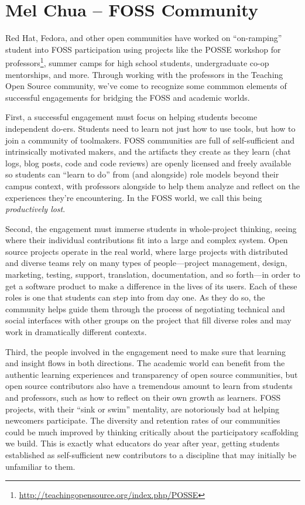 \documentclass{sig-alt-release2}
\begin{document}
\section{Mel Chua -- FOSS Community}

Red Hat, Fedora, and other open communities have worked on ``on-ramping'' student into FOSS participation using projects like the POSSE workshop for professors\footnote{\url{http://teachingopensource.org/index.php/POSSE}}, summer camps for high school students, undergraduate co-op mentorships, and more. Through working with the professors in the Teaching Open Source community, we've come to recognize some commmon elements of successful engagements for bridging the FOSS and academic worlds.

First, a successful engagement must focus on helping students become independent do-ers. Students need to learn not just how to use tools, but how to join a community of toolmakers. FOSS communities are full of self-sufficient and intrinsically motivated makers, and the artifacts they create as they learn (chat logs, blog posts, code and code reviews) are openly licensed and freely available so students can ``learn to do'' from (and alongside) role models beyond their campus context, with professors alongside to help them analyze and reflect on the experiences they're encountering. In the FOSS world, we call this being {\em productively lost}.

Second, the engagement must immerse students in whole-project thinking, seeing where their individual contributions fit into a large and complex system. Open source projects operate in the real world, where large projects with distributed and diverse teams rely on many types of people---project management, design, marketing, testing, support, translation, documentation,  and so forth---in order to get a software product to make a difference in the lives of its users. Each of these roles is one that students can step into from day one. As they do so, the community helps guide them through the process of negotiating technical and social interfaces with other groups on the project that fill diverse roles and may work in dramatically different contexts.

Third, the people involved in the engagement need to make sure that learning and insight flows in both directions. The academic world can benefit from the authentic learning experiences and transparency of open source communities, but open source contributors also have a tremendous amount to learn from students and professors, such as how to reflect on their own growth as learners. FOSS projects, with their ``sink or swim'' mentality, are notoriously bad at helping newcomers participate. The diversity and retention rates of our communities could be much improved by thinking critically about the participatory scaffolding we build.  This is exactly what educators do year after year, getting students established as self-sufficient new contributors to a discipline that may initially be unfamiliar to them.
\end{document}
